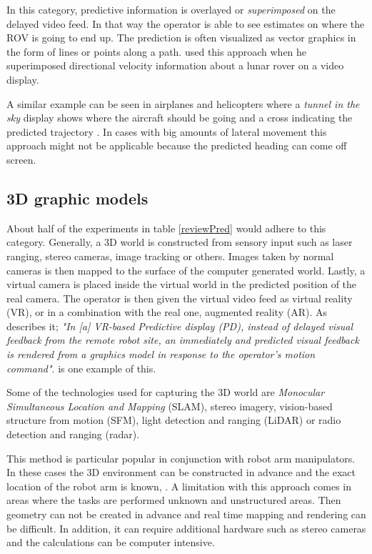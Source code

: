 
In this category, predictive information is overlayed or \emph{superimposed} on the delayed video feed. In that way the operator is able to see estimates on where the ROV is going to end up. The prediction is often visualized as vector graphics in the form of lines or points along a path. \citep{Mathan1996} used this approach when he superimposed directional velocity information about a lunar rover on a video display.

A similar example can be seen in airplanes and helicopters where a \emph{tunnel in the sky} display shows where the aircraft should be going and a cross indicating the predicted trajectory \citep{Grunwald1981}. In cases with big amounts of lateral movement this approach might not be applicable because the predicted heading can come off screen.

\subsection{3D graphic models}

About half of the experiments in table \ref{reviewPred} would adhere to this category. Generally, a 3D world is constructed from sensory input such as laser ranging, stereo cameras, image tracking or others. Images taken by normal cameras is then mapped to the surface of the computer generated world. Lastly, a virtual camera is placed inside the virtual world in the predicted position of the real camera. The operator is then given the virtual video feed as virtual reality (VR), or in a combination with the real one, augmented reality (AR). As \citep{Hu2016} describes it; \textit{"In [a] VR-based Predictive display (PD), instead of delayed visual feedback from the remote robot site, an immediately and predicted visual feedback is rendered from a graphics model in response to the operator's motion command"}. \citep{Kim1993} is one example of this.

Some of the technologies used for capturing the 3D world are \textit{Monocular Simultaneous Location and Mapping} (SLAM), stereo imagery, vision-based structure from motion (SFM), light detection and ranging (LiDAR) or radio detection and ranging (radar).

This method is particular popular in conjunction with robot arm manipulators. In these cases the 3D environment can be constructed in advance and the exact location of the robot arm is known, \citep{Ricks2004}. A limitation with this approach comes in areas where the tasks are performed unknown and unstructured areas. Then geometry can not be created in advance and real time mapping and rendering can be difficult. In addition, it can require additional hardware such as stereo cameras and the calculations can be computer intensive.

